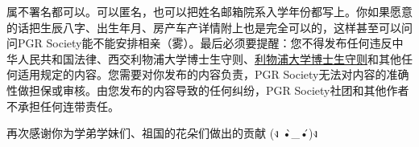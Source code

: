 \vspace{5mm}
属不署名都可以。可以匿名，也可以把姓名邮箱院系入学年份都写上。你如果愿意的话把生辰八字、出生年月、房产车产详情附上也是完全可以的，这样甚至可以问问PGR Society能不能安排相亲（雾）。最后必须要提醒：您不得发布任何违反中华人民共和国法律、西交利物浦大学博士生守则、\href{https://www.liverpool.ac.uk/aqsd/academic-codes-of-practice/pgr-code-of-practice/}{利物浦大学博士生守则}和其他任何适用规定的内容。您需要对你发布的内容负责，PGR Society无法对内容的准确性做担保或审核。由您发布的内容导致的任何纠纷，PGR Society社团和其他作者不承担任何连带责任。

\vspace{5mm}
再次感谢你为学弟学妹们、祖国的花朵们做出的贡献  (ง •̀\_•́)ง